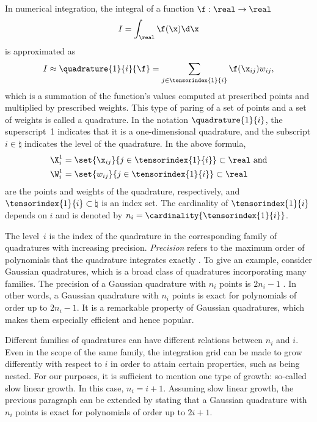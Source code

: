 In numerical integration, the integral of a function $\f: \real \to \real$
\[
  I = \int_\real \f(\x) \d \x
\]
is approximated as
\[
  I \approx \quadrature{1}{i}{\f}
  = \sum_{j \in \tensorindex{1}{i}} \f(\x_{ij}) w_{ij},
\]
which is a summation of the function's values computed at prescribed points and
multiplied by prescribed weights. This type of paring of a set of points and a
set of weights is called a quadrature. In the notation $\quadrature{1}{i}$, the
superscript~1 indicates that it is a one-dimensional quadrature, and the
subscript $i \in \natural$ indicates the level of the quadrature. In the above
formula,
\begin{align*}
  & \X^1_i = \set{\x_{ij}}{j \in \tensorindex{1}{i}} \subset \real \text{ and} \\
  & \W^1_i = \set{w_{ij}}{j \in \tensorindex{1}{i}} \subset \real
\end{align*}
are the points and weights of the quadrature, respectively, and
$\tensorindex{1}{i} \subset \natural$ is an index set. The cardinality of
$\tensorindex{1}{i}$ depends on $i$ and is denoted by $n_i =
\cardinality{\tensorindex{1}{i}}$.

The level~$i$ is the index of the quadrature in the corresponding family of
quadratures with increasing precision. \emph{Precision} refers to the maximum
order of polynomials that the quadrature integrates exactly \cite{heiss2008}. To
give an example, consider Gaussian quadratures, which is a broad class of
quadratures incorporating many families. The precision of a Gaussian quadrature
with $n_i$ points is $2 n_i - 1$ \cite{heiss2008}. In other words, a Gaussian
quadrature with $n_i$ points is exact for polynomials of order up to $2 n_i -
1$. It is a remarkable property of Gaussian quadratures, which makes them
especially efficient and hence popular.

Different families of quadratures can have different relations between $n_i$ and
$i$. Even in the scope of the same family, the integration grid can be made to
grow differently with respect to $i$ in order to attain certain properties, such
as being nested. For our purposes, it is sufficient to mention one type of
growth: so-called slow linear growth. In this case, $n_i = i + 1$. Assuming slow
linear growth, the previous paragraph can be extended by stating that a Gaussian
quadrature with $n_i$ points is exact for polynomials of order up to $2 i + 1$.

